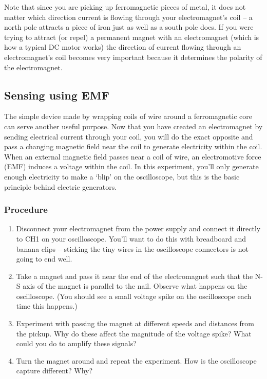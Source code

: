\documentclass[11pt]{article} %
\begin{document}
Note that since you are picking up ferromagnetic pieces of metal, it does not matter which direction current is flowing through your electromagnet’s coil -- a north pole attracts a piece of iron just as well as a south pole does. If you were trying to attract (or repel) a permanent magnet with an electromagnet (which is how a typical DC motor works) the direction of current flowing through an electromagnet’s coil becomes very important because it determines the polarity of the electromagnet.

\subsection*{Sensing using EMF}

The simple device made by wrapping coils of wire around a ferromagnetic core can serve another useful purpose. Now that you have created an electromagnet by sending electrical current through your coil, you will do the exact opposite and pass a changing magnetic field near the coil to generate electricity within the coil. When an external magnetic field passes near a coil of wire, an electromotive force (EMF) induces a voltage within the coil.  In this experiment, you’ll only generate enough electricity to make a ‘blip’ on the oscilloscope, but this is the basic principle behind electric generators.

\subsubsection*{Procedure}

\begin{enumerate}
\item Disconnect your electromagnet from the power supply and connect it directly to CH1 on your oscilloscope. You’ll want to do this with breadboard and banana clips -- sticking the tiny wires in the oscilloscope connectors is not going to end well.
\item Take a magnet and pass it near the end of the electromagnet such that the N-S axis of the magnet is parallel to the nail. Observe what happens on the oscilloscope. (You should see a small voltage spike on the oscilloscope each time this happens.)
\item Experiment with passing the magnet at different speeds and distances from the pickup. Why do these affect the magnitude of the voltage spike? What could you do to amplify these signals?
\item Turn the magnet around and repeat the experiment. How is the oscilloscope capture different? Why?
\end{enumerate}
\end{document}
